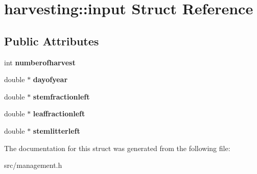 \hypertarget{structharvesting_1_1input}{\section{harvesting\-:\-:input Struct Reference}
\label{structharvesting_1_1input}
}
\subsection*{Public Attributes}
\begin{DoxyCompactItemize}
\item 
\hypertarget{structharvesting_1_1input_a8b20b9d27794d38196d4a8cc5267ecd7}{int {\bfseries numberofharvest}}\label{structharvesting_1_1input_a8b20b9d27794d38196d4a8cc5267ecd7}

\item 
\hypertarget{structharvesting_1_1input_a1aca4e7ce61f52cc78a905a270cdf0b9}{double $\ast$ {\bfseries dayofyear}}\label{structharvesting_1_1input_a1aca4e7ce61f52cc78a905a270cdf0b9}

\item 
\hypertarget{structharvesting_1_1input_a3800d3300b8ee33e6c3dc9972dbaeedc}{double $\ast$ {\bfseries stemfractionleft}}\label{structharvesting_1_1input_a3800d3300b8ee33e6c3dc9972dbaeedc}

\item 
\hypertarget{structharvesting_1_1input_a74b8f251c2867a9959e374c5dec02ae6}{double $\ast$ {\bfseries leaffractionleft}}\label{structharvesting_1_1input_a74b8f251c2867a9959e374c5dec02ae6}

\item 
\hypertarget{structharvesting_1_1input_a99b1eae54c4fe04c1ac5eaa1c33aca1e}{double $\ast$ {\bfseries stemlitterleft}}\label{structharvesting_1_1input_a99b1eae54c4fe04c1ac5eaa1c33aca1e}

\end{DoxyCompactItemize}


The documentation for this struct was generated from the following file\-:\begin{DoxyCompactItemize}
\item 
src/management.\-h\end{DoxyCompactItemize}
